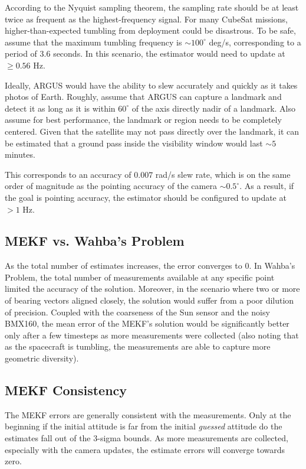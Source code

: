 \documentclass[conference,onecolumn,draftclsnofoot]{IEEEtran}
\begin{document}
According to the Nyquist sampling theorem, the sampling rate should be at least twice as frequent as the highest-frequency signal. For many CubeSat missions, higher-than-expected tumbling from deployment could be disastrous. To be safe, assume that the maximum tumbling frequency is $\sim 100^{\circ}$ deg/s, corresponding to a period of $3.6$ seconds. In this scenario, the estimator would need to update at $\ge0.56$ Hz.


Ideally, ARGUS would have the ability to slew accurately and quickly as it takes photos of Earth. Roughly, assume that ARGUS can capture a landmark and detect it as long as it is within $60^{\circ}$ of the axis directly nadir of a landmark. Also assume for best performance, the landmark or region needs to be completely centered. Given that the satellite may not pass directly over the landmark, it can be estimated that a ground pass inside the visibility window would last $\sim5$ minutes. 

This corresponds to an accuracy of $0.007$ rad/s slew rate, which is on the same order of magnitude as the pointing accuracy of the camera $\sim 0.5^{\circ}$. As a result, if the goal is pointing accuracy, the estimator should be configured to update at $> 1$ Hz.

\subsection{MEKF vs. Wahba's Problem}

As the total number of estimates increases, the error converges to 0. In Wahba's Problem, the total number of measurements available at any specific point limited the accuracy of the solution. Moreover, in the scenario where two or more of bearing vectors aligned closely, the solution would suffer from a poor dilution of precision. Coupled with the coarseness of the Sun sensor and the noisy BMX160, the mean error of the MEKF's solution would be significantly better only after a few timesteps as more measurements were collected (also noting that as the spacecraft is tumbling, the measurements are able to capture more geometric diversity). 

\subsection{MEKF Consistency}

The MEKF errors are generally consistent with the measurements. Only at the beginning if the initial attitude is far from the initial \textit{guessed} attitude do the estimates fall out of the 3-sigma bounds. As more measurements are collected, especially with the camera updates, the estimate errors will converge towards zero.
\end{document}
